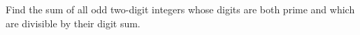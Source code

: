 Find the sum of all odd two-digit integers whose digits are both prime and which are divisible by their digit sum.
